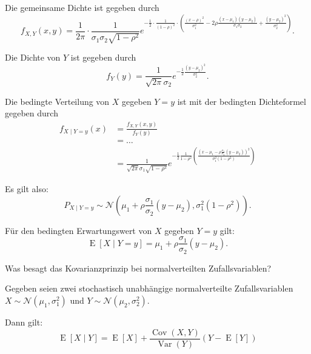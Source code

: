 \begin{QandA}
\begin{answered}
        Die gemeinsame Dichte ist gegeben durch
        \[
            f_{X,Y}(x, y) = \frac{1}{2 \pi} \cdot \frac{1}{\sigma_1 \sigma_2 \sqrt{1 - \rho^2}} e^{-\frac{1}{2} \cdot \frac{1}{(1-\rho)^2} \cdot \left( \frac{(x-\rho)^2}{\sigma_1^2} - 2 \rho \frac{(x-\mu_1)(y-\mu_2)}{\sigma_1 \sigma_2} + \frac{(y-\mu_2)^2}{\sigma_2^2} \right)}.
        \]

        Die Dichte von $Y$ ist gegeben durch
        \[
            f_Y(y) = \frac{1}{\sqrt{2 \pi} \sigma_2} e^{-\frac{1}{2} \frac{(y - \mu_2)^2}{\sigma_2^2}}.
        \]

        Die bedingte Verteilung von $X$ gegeben $Y = y$ ist mit der bedingten Dichteformel gegeben durch
        \[
            \begin{aligned}
                f_{X \mid Y = y}(x) & = \frac{f_{X,Y}(x, y)}{f_Y(y)}                                                                                                                                                                      \\
                                    & = \ldots                                                                                                                                                                                            \\
                                    & = \frac{1}{\sqrt{2 \pi} \sigma_1 \sqrt{1 - \rho^2}} e^{-\frac{1}{2} \frac{1}{1 - \rho^2} \left( \frac{(x - \mu_1 - \rho \frac{\sigma_1}{\sigma_2} (y - \mu_2))^2}{\sigma_1^2 (1 - \rho^2)} \right)}
            \end{aligned}
        \]

        Es gilt also:
        \[
            P_{X \mid Y = y} \sim \mathcal{N}(\mu_1 + \rho \frac{\sigma_1}{\sigma_2} (y - \mu_2), \sigma_1^2 (1 - \rho^2)).
        \]

        Für den bedingten Erwartungswert von $X$ gegeben $Y = y$ gilt:
        \[
            \operatorname{E}[X \mid Y = y] = \mu_1 + \rho \frac{\sigma_1}{\sigma_2} (y - \mu_2).
        \]
    \end{answered}

    \item Was besagt das Kovarianzprinzip bei normalverteilten Zufallsvariablen?
    \begin{answered}
        Gegeben seien zwei stochastisch unabhängige normalverteilte Zufallsvariablen $X \sim \mathcal{N}(\mu_1, \sigma_1^2)$ und $Y \sim \mathcal{N}(\mu_2, \sigma_2^2)$.

        Dann gilt:
        \begin{equation}
            \tag{Kovarianzprinzip}
            \operatorname{E}[X \mid Y] = \operatorname{E}[X] + \frac{\operatorname{Cov}(X, Y)}{\operatorname{Var}(Y)} (Y - \operatorname{E}[Y])
        \end{equation}
    \end{answered}


\end{QandA}
